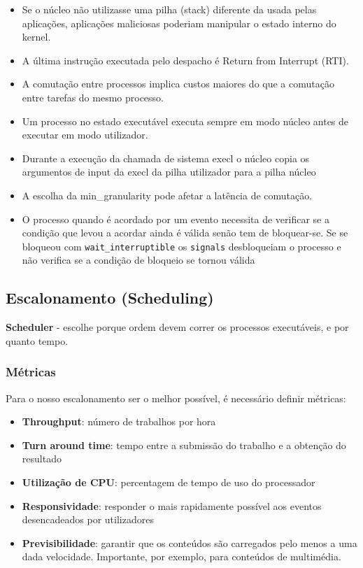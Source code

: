 \documentclass[11pt]{article}
\begin{document}
\begin{itemize}
    \item Se o núcleo não utilizasse uma pilha (stack) diferente da usada pelas aplicações, aplicações maliciosas poderiam manipular o estado interno do kernel.
    \item A última instrução executada pelo despacho é Return from Interrupt (RTI).
    \item A comutação entre processos implica custos maiores do que a comutação entre tarefas do mesmo processo.
    \item Um processo no estado executável executa sempre em modo núcleo antes de executar em modo utilizador.
    \item Durante a execução da chamada de sistema execl o núcleo copia os argumentos de input da execl da pilha utilizador para a pilha núcleo
    \item A escolha da min\_granularity pode afetar a latência de comutação.
    \item O processo quando é acordado por um evento necessita de verificar se a condição que levou a acordar ainda é válida senão tem de bloquear-se. Se se bloqueou com \lstinline|wait_interruptible| os \lstinline|signals| desbloqueiam o processo e não verifica se a condição de bloqueio se tornou válida
\end{itemize}

\subsection{Escalonamento (Scheduling)}

\textbf{Scheduler} - escolhe porque ordem devem correr os processos executáveis, e por quanto tempo.

\subsubsection*{Métricas}

Para o nosso escalonamento ser o melhor possível, é necessário definir métricas:
\begin{itemize}
    \item \textbf{Throughput}: número de trabalhos por hora
    \item \textbf{Turn around time}: tempo entre a submissão do trabalho e a obtenção do resultado
    \item \textbf{Utilização de CPU}: percentagem de tempo de uso do processador
    \item \textbf{Responsividade}: responder o mais rapidamente possível aos eventos desencadeados por utilizadores
    \item \textbf{Previsibilidade}: garantir que os conteúdos são carregados pelo menos a uma dada velocidade. Importante, por exemplo, para conteúdos de multimédia.
\end{itemize}
\end{document}
